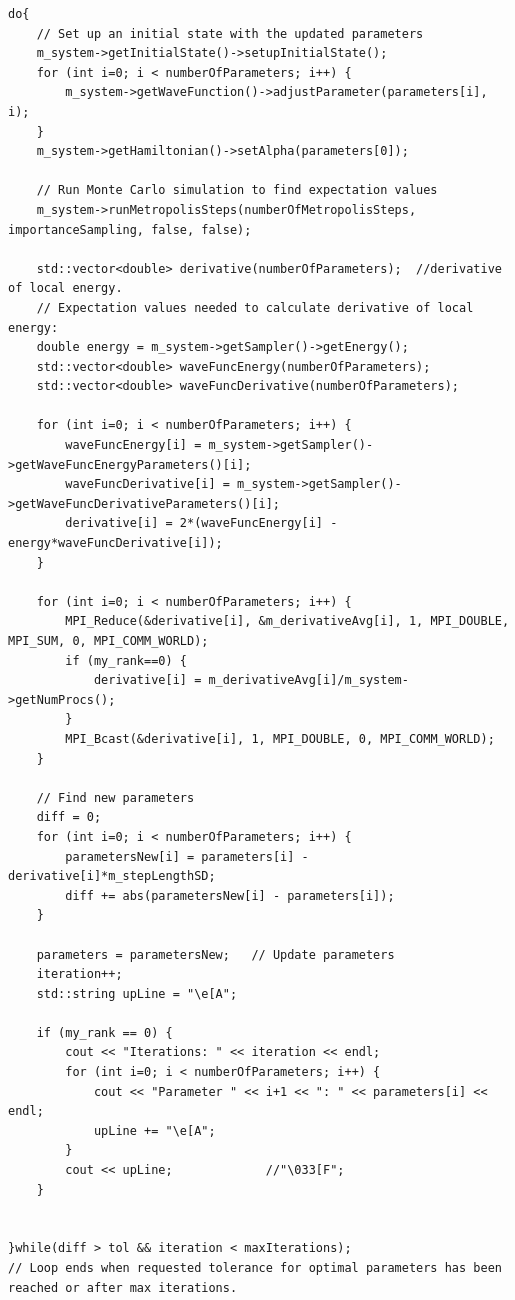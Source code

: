 \documentclass[../main.tex]{subfiles}
\begin{document}
\lstset{language=c++}
\begin{lstlisting}[caption={Loop for variation of the variational parameters using the steepest descent method.}]
do{
    // Set up an initial state with the updated parameters
    m_system->getInitialState()->setupInitialState();
    for (int i=0; i < numberOfParameters; i++) {
        m_system->getWaveFunction()->adjustParameter(parameters[i], i);
    }
    m_system->getHamiltonian()->setAlpha(parameters[0]);

    // Run Monte Carlo simulation to find expectation values
    m_system->runMetropolisSteps(numberOfMetropolisSteps, importanceSampling, false, false);

    std::vector<double> derivative(numberOfParameters);  //derivative of local energy.
    // Expectation values needed to calculate derivative of local energy:
    double energy = m_system->getSampler()->getEnergy();
    std::vector<double> waveFuncEnergy(numberOfParameters);
    std::vector<double> waveFuncDerivative(numberOfParameters);

    for (int i=0; i < numberOfParameters; i++) {
        waveFuncEnergy[i] = m_system->getSampler()->getWaveFuncEnergyParameters()[i];
        waveFuncDerivative[i] = m_system->getSampler()->getWaveFuncDerivativeParameters()[i];
        derivative[i] = 2*(waveFuncEnergy[i] - energy*waveFuncDerivative[i]);
    }

    for (int i=0; i < numberOfParameters; i++) {
        MPI_Reduce(&derivative[i], &m_derivativeAvg[i], 1, MPI_DOUBLE, MPI_SUM, 0, MPI_COMM_WORLD);
        if (my_rank==0) {
            derivative[i] = m_derivativeAvg[i]/m_system->getNumProcs();
        }
        MPI_Bcast(&derivative[i], 1, MPI_DOUBLE, 0, MPI_COMM_WORLD);
    }

    // Find new parameters
    diff = 0;
    for (int i=0; i < numberOfParameters; i++) {
        parametersNew[i] = parameters[i] - derivative[i]*m_stepLengthSD;
        diff += abs(parametersNew[i] - parameters[i]);
    }

    parameters = parametersNew;   // Update parameters
    iteration++;
    std::string upLine = "\e[A";

    if (my_rank == 0) {
        cout << "Iterations: " << iteration << endl;
        for (int i=0; i < numberOfParameters; i++) {
            cout << "Parameter " << i+1 << ": " << parameters[i] << endl;
            upLine += "\e[A";
        }
        cout << upLine;             //"\033[F";
    }


}while(diff > tol && iteration < maxIterations);
// Loop ends when requested tolerance for optimal parameters has been reached or after max iterations.
\end{lstlisting}
\end{document}
